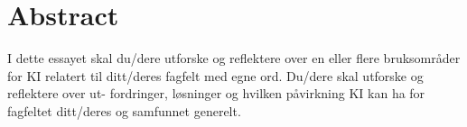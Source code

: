\chapter*{Abstract}
I dette essayet skal du/dere utforske og reflektere over en eller flere bruksområder for KI
relatert til ditt/deres fagfelt med egne ord. Du/dere skal utforske og reflektere over ut-
fordringer, løsninger og hvilken påvirkning KI kan ha for fagfeltet ditt/deres og samfunnet
generelt.